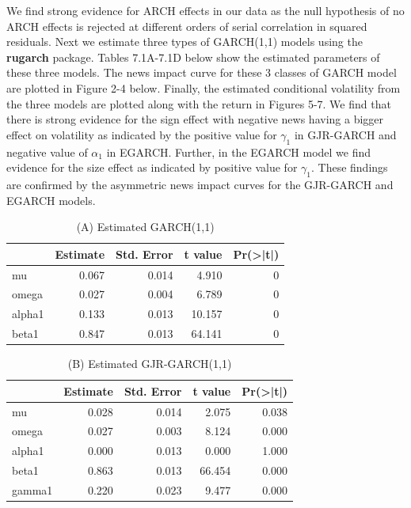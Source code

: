 \documentclass[]{book}
\theoremstyle{definition}
\theoremstyle{definition}
\theoremstyle{definition}
\theoremstyle{remark}
\begin{document}
We find strong evidence for ARCH effects in our data as the null hypothesis of no ARCH effects is rejected at different orders of serial correlation in squared residuals. Next we estimate three types of GARCH(1,1) models using the \textbf{rugarch} package. Tables 7.1A-7.1D below show the estimated parameters of these three models. The news impact curve for these 3 classes of GARCH model are plotted in Figure 2-4 below. Finally, the estimated conditional volatility from the three models are plotted along with the return in Figures 5-7. We find that there is strong evidence for the sign effect with negative news having a bigger effect on volatility as indicated by the positive value for \(\gamma_1\) in GJR-GARCH and negative value of \(\alpha_1\) in EGARCH. Further, in the EGARCH model we find evidence for the size effect as indicated by positive value for \(\gamma_1\). These findings are confirmed by the asymmetric news impact curves for the GJR-GARCH and EGARCH models.

\begin{table}[t]

\caption{\label{tab:unnamed-chunk-11}(A) Estimated GARCH(1,1)}
\centering
\begin{tabular}{l|r|r|r|r}
\hline
  &  Estimate &  Std. Error &  t value & Pr(>|t|)\\
\hline
mu & 0.067 & 0.014 & 4.910 & 0\\
\hline
omega & 0.027 & 0.004 & 6.789 & 0\\
\hline
alpha1 & 0.133 & 0.013 & 10.157 & 0\\
\hline
beta1 & 0.847 & 0.013 & 64.141 & 0\\
\hline
\end{tabular}
\end{table}

\begin{table}[t]

\caption{\label{tab:unnamed-chunk-11}(B) Estimated GJR-GARCH(1,1)}
\centering
\begin{tabular}{l|r|r|r|r}
\hline
  &  Estimate &  Std. Error &  t value & Pr(>|t|)\\
\hline
mu & 0.028 & 0.014 & 2.075 & 0.038\\
\hline
omega & 0.027 & 0.003 & 8.124 & 0.000\\
\hline
alpha1 & 0.000 & 0.013 & 0.000 & 1.000\\
\hline
beta1 & 0.863 & 0.013 & 66.454 & 0.000\\
\hline
gamma1 & 0.220 & 0.023 & 9.477 & 0.000\\
\hline
\end{tabular}
\end{table}
\end{document}
